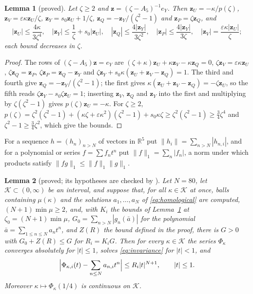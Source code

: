 \documentclass[11pt]{article}
\newtheorem{lemma}{Lemma}[section]
\theoremstyle{definition}
\newcommand{\R}{\mathbb{R}}
\newcommand{\eps}{\varepsilon}
\newcommand{\Kset}{\mathcal{K}}
\begin{document}
\begin{lemma}[proved]\label{lem:resolvent}
Let $\zeta \ge 2$ and $\mathbf{z} = (\zeta - A_5)^{-1} e_Y$. Then $\mathbf{z}_U = -\kappa/p(\zeta)$, $\mathbf{z}_V = \eps\kappa \mathbf{z}_U/\zeta$, $\mathbf{z}_Y = s_0\mathbf{z}_U + 1/\zeta$, $\mathbf{z}_Q = -\mathbf{z}_Y/(\zeta^2 - 1)$ and $\mathbf{z}_P = \zeta \mathbf{z}_Q$, and
\[
  |\mathbf{z}_U| \le \frac{4\kappa}{3\zeta^4}, \quad |\mathbf{z}_Y| \le \frac1\zeta + s_0|\mathbf{z}_U|, \quad |\mathbf{z}_Q| \le \frac{4|\mathbf{z}_Y|}{3\zeta^2}, \quad |\mathbf{z}_P| \le \frac{4|\mathbf{z}_Y|}{3\zeta}, \quad |\mathbf{z}_V| = \frac{\eps\kappa|\mathbf{z}_U|}{\zeta};
\]
each bound decreases in $\zeta$.
\end{lemma}

\begin{proof}
The rows of $(\zeta - A_5)\mathbf{z} = e_Y$ are $(\zeta + \kappa)\mathbf{z}_U + \kappa \mathbf{z}_V - \kappa \mathbf{z}_Q = 0$, $\zeta \mathbf{z}_V = \eps\kappa \mathbf{z}_U$, $\zeta \mathbf{z}_Q = \mathbf{z}_P$, $\zeta \mathbf{z}_P = \mathbf{z}_Q - \mathbf{z}_Y$ and $\zeta \mathbf{z}_Y + s_0\kappa(\mathbf{z}_U + \mathbf{z}_V - \mathbf{z}_Q) = 1$. The third and fourth give $\mathbf{z}_Q = -\mathbf{z}_Y/(\zeta^2 - 1)$; the first gives $\kappa(\mathbf{z}_U + \mathbf{z}_V - \mathbf{z}_Q) = -\zeta \mathbf{z}_U$, so the fifth reads $\zeta\mathbf{z}_Y - s_0\zeta\mathbf{z}_U = 1$; inserting $\mathbf{z}_V$, $\mathbf{z}_Q$ and $\mathbf{z}_Y$ into the first and multiplying by $\zeta(\zeta^2 - 1)$ gives $p(\zeta)\mathbf{z}_U = -\kappa$. For $\zeta \ge 2$, $p(\zeta) = \zeta^2(\zeta^2 - 1) + (\kappa\zeta + \eps\kappa^2)(\zeta^2 - 1) + s_0\kappa\zeta \ge \zeta^2(\zeta^2 - 1) \ge \frac34\zeta^4$ and $\zeta^2 - 1 \ge \frac34\zeta^2$, which give the bounds.
\end{proof}

For a sequence $h = (h_n)_{n > N}$ of vectors in $\R^5$ put $\|h_i\| = \sum_{n > N}|h_{n, i}|$, and for a polynomial or series $f = \sum f_n t^n$ put $\|f\|_1 = \sum_n |f_n|$, a norm under which products satisfy $\|fg\|_1 \le \|f\|_1\|g\|_1$.

\begin{lemma}[proved; its hypotheses are checked by ]\label{lem:manifold}
Let $N = 80$, let $\Kset \subset (0, \infty)$ be an interval, and suppose that, for all $\kappa \in \Kset$ at once, balls containing $\mu(\kappa)$ and the solutions $a_1, \dots, a_N$ of \eqref{eq:homological} are computed, $(N + 1)\min\mu \ge 2$, and, with $K_i$ the bounds of Lemma~\ref{lem:resolvent} at $\zeta_0 = (N + 1)\min\mu$, $G_0 = \sum_{n > N}|g_n(\bar a)|$ for the polynomial $\bar a = \sum_{1 \le n \le N} a_n t^n$, and $Z(R)$ the bound defined in the proof, there is $G > 0$ with $G_0 + Z(R) \le G$ for $R_i = K_iG$. Then for every $\kappa \in \Kset$ the series $\Phi_\kappa$ converges absolutely for $|t| \le 1$, solves \eqref{eq:invariance} for $|t| < 1$, and
\begin{equation}\label{eq:tailbound}
  \Bigl|\Phi_{\kappa, i}(t) - \sum_{n \le N} a_{n, i} t^n\Bigr| \le R_i |t|^{N + 1}, \qquad |t| \le 1 .
\end{equation}
Moreover $\kappa \mapsto \Phi_\kappa(1/4)$ is continuous on $\Kset$.
\end{lemma}
\end{document}
